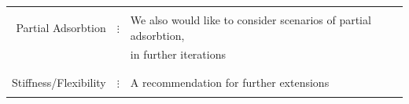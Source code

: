 \documentclass[10pt,letterpaper]{article}
\begin{document}
\begin{center}
\begin{tabular}{r|c|l}
	&&\\
	\hline
	&&\\ 
	Partial Adsorbtion& $\vdots$& We also would like to consider scenarios of partial adsorbtion,\\&&in further iterations\\
	&&\\
	\hline
	&&\\ 
	Stiffness/Flexibility& $\vdots$& A recommendation for further extensions\\
	&&\\ 
	\hline 
\end{tabular}
\end{center}



\newpage
\end{document}
